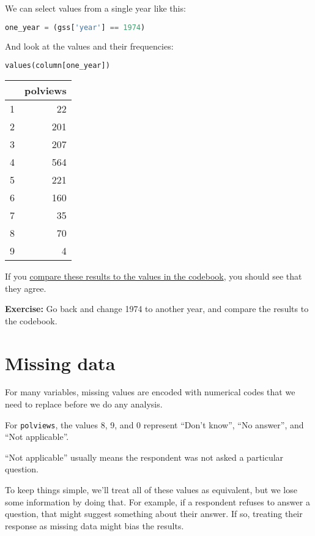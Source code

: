 We can select values from a single year like this:

\begin{lstlisting}[language=Python,style=source]
one_year = (gss['year'] == 1974)
\end{lstlisting}

And look at the values and their frequencies:

\begin{lstlisting}[language=Python,style=source]
values(column[one_year])
\end{lstlisting}

\begin{tabular}{lr}
\toprule
{} &  polviews \\
\midrule
1 &        22 \\
2 &       201 \\
3 &       207 \\
4 &       564 \\
5 &       221 \\
6 &       160 \\
7 &        35 \\
8 &        70 \\
9 &         4 \\
\bottomrule
\end{tabular}

If you
\href{https://gssdataexplorer.norc.org/projects/52787/variables/178/vshow}{compare
these results to the values in the codebook}, you should see that they
agree.

\textbf{Exercise:} Go back and change 1974 to another year, and compare
the results to the codebook.

\hypertarget{missing-data}{%
\section{Missing data}\label{missing-data}}

For many variables, missing values are encoded with numerical codes that
we need to replace before we do any analysis.

For \passthrough{\lstinline!polviews!}, the values 8, 9, and 0 represent
``Don't know'', ``No answer'', and ``Not applicable''.

``Not applicable'' usually means the respondent was not asked a
particular question.

To keep things simple, we'll treat all of these values as equivalent,
but we lose some information by doing that. For example, if a respondent
refuses to answer a question, that might suggest something about their
answer. If so, treating their response as missing data might bias the
results.

